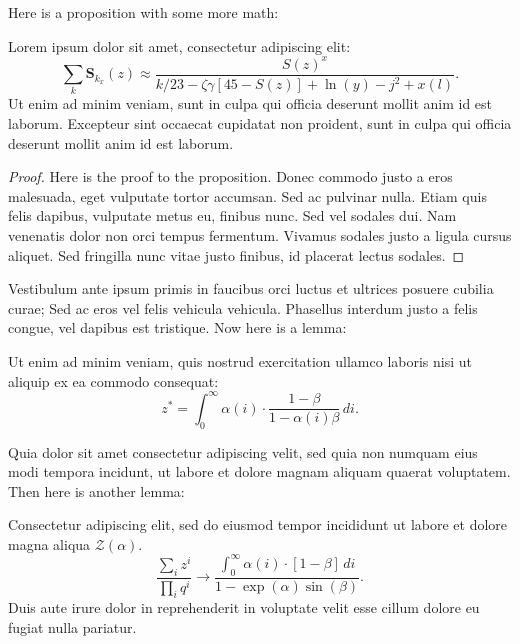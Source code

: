\documentclass[letterpaper,11pt,leqno]{article}
\begin{document}
Here is a proposition with some more math:   

\begin{proposition}\label{p:type1}  Lorem ipsum dolor sit amet, consectetur adipiscing elit:
\begin{equation}
\sum_k\bm{S}_{k_x}(z) \approx \frac{S(z)^x}{k / 23 -\zeta\gamma [45- S(z)] + \ln(y) - j^2+x(l)}.
\label{e:type1}\end{equation}
Ut enim ad minim veniam, sunt in culpa qui officia deserunt mollit anim id est laborum. Excepteur sint occaecat cupidatat non proident, sunt in culpa qui officia deserunt mollit anim id est laborum.
\end{proposition}

\begin{proof} Here is the proof to the proposition. Donec commodo justo a eros malesuada, eget vulputate tortor accumsan. Sed ac pulvinar nulla. Etiam quis felis dapibus, vulputate metus eu, finibus nunc. Sed vel sodales dui. Nam venenatis dolor non orci tempus fermentum. Vivamus sodales justo a ligula cursus aliquet. Sed fringilla nunc vitae justo finibus, id placerat lectus sodales.\end{proof} 

Vestibulum ante ipsum primis in faucibus orci luctus et ultrices posuere cubilia curae; Sed ac eros vel felis vehicula vehicula. Phasellus interdum justo a felis congue, vel dapibus est tristique. Now here is a lemma:

\begin{lemma}\label{p:cv} Ut enim ad minim veniam, quis nostrud exercitation ullamco laboris nisi ut aliquip ex ea commodo consequat:
\begin{equation}
z^* = \int_{0}^{\infty} \alpha(i) \cdot \frac{1-\beta}{1-\alpha(i)\beta}\,di.
\label{e:cv}\end{equation}
\end{lemma}

Quia dolor sit amet consectetur adipiscing velit, sed quia non numquam eius modi tempora incidunt, ut labore et dolore magnam aliquam quaerat voluptatem.  Then here is another lemma:

\begin{lemma}
Consectetur adipiscing elit, sed do eiusmod tempor incididunt ut labore et dolore magna aliqua $\mathcal{Z}(\alpha)$. 
\begin{equation*}
\frac{\sum_i z^i}{\prod_i q^i} \to \frac{\int_{0}^{\infty} \alpha(i) \cdot [1-\beta]\,di}{1-\exp(\alpha)\sin(\beta)}.
\end{equation*}
Duis aute irure dolor in reprehenderit in voluptate velit esse cillum dolore eu fugiat nulla pariatur. 
\end{lemma}
\end{document}
